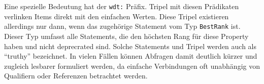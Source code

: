 Eine spezielle Bedeutung hat der \verb|wdt:| Präfix.
Tripel mit diesen Prädikaten verlinken Items direkt mit den einfachen Werten.
Diese Tripel existieren allerdings nur dann, wenn das zugehörige Statement vom Typ \verb|BestRank| ist.
Dieser Typ umfasst alle Statements, die den höchsten Rang für diese Property haben und nicht deprecrated sind.
Solche Statements und Tripel werden auch als "`truthy"' bezeichnet.
In vielen Fällen können Abfragen damit deutlich kürzer und zugleich lesbarer formuliert werden, da einfache Verbindungen oft unabhängig von Qualifiern oder Referenzen betrachtet werden.

